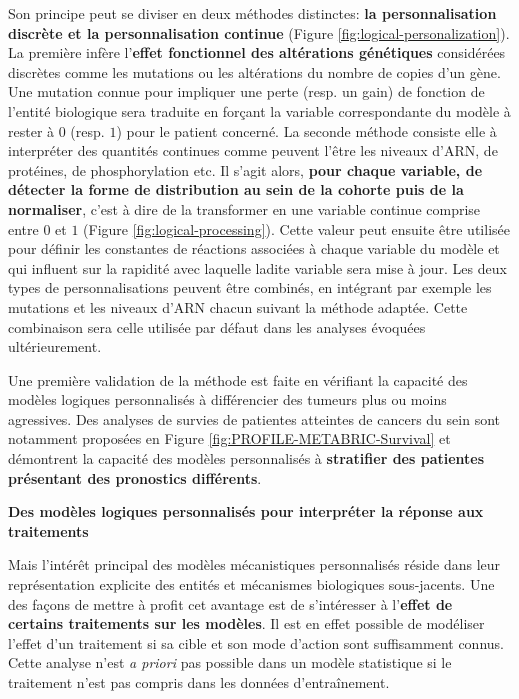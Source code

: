 \documentclass[a4paper,12pt,twoside,onecolumn,openright,final,oldfontcommands]{memoir}
\begin{document}
Son principe peut se diviser en deux méthodes distinctes: \textbf{la
personnalisation discrète et la personnalisation continue} (Figure
\ref{fig:logical-personalization}). La première infère l'\textbf{effet
fonctionnel des altérations génétiques} considérées discrètes comme les
mutations ou les altérations du nombre de copies d'un gène. Une mutation
connue pour impliquer une perte (resp. un gain) de fonction de l'entité
biologique sera traduite en forçant la variable correspondante du modèle
à rester à \(0\) (resp. \(1\)) pour le patient concerné. La seconde
méthode consiste elle à interpréter des quantités continues comme
peuvent l'être les niveaux d'ARN, de protéines, de phosphorylation etc.
Il s'agit alors, \textbf{pour chaque variable, de détecter la forme de
distribution au sein de la cohorte puis de la normaliser}, c'est à dire
de la transformer en une variable continue comprise entre \(0\) et \(1\)
(Figure \ref{fig:logical-processing}). Cette valeur peut ensuite être
utilisée pour définir les constantes de réactions associées à chaque
variable du modèle et qui influent sur la rapidité avec laquelle ladite
variable sera mise à jour. Les deux types de personnalisations peuvent
être combinés, en intégrant par exemple les mutations et les niveaux
d'ARN chacun suivant la méthode adaptée. Cette combinaison sera celle
utilisée par défaut dans les analyses évoquées ultérieurement.

Une première validation de la méthode est faite en vérifiant la capacité
des modèles logiques personnalisés à différencier des tumeurs plus ou
moins agressives. Des analyses de survies de patientes atteintes de
cancers du sein sont notamment proposées en Figure
\ref{fig:PROFILE-METABRIC-Survival} et démontrent la capacité des
modèles personnalisés à \textbf{stratifier des patientes présentant des
pronostics différents}.

\textbf{Des modèles logiques personnalisés pour interpréter la réponse
aux traitements}

Mais l'intérêt principal des modèles mécanistiques personnalisés réside
dans leur représentation explicite des entités et mécanismes biologiques
sous-jacents. Une des façons de mettre à profit cet avantage est de
s'intéresser à l'\textbf{effet de certains traitements sur les modèles}.
Il est en effet possible de modéliser l'effet d'un traitement si sa
cible et son mode d'action sont suffisamment connus. Cette analyse n'est
\emph{a priori} pas possible dans un modèle statistique si le traitement
n'est pas compris dans les données d'entraînement.
\end{document}
